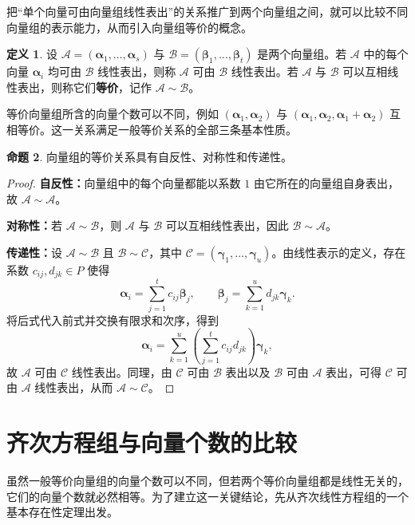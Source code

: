 \documentclass[UTF8, fontset=fandol, a4paper, 12pt]{ctexart}
\newcommand{\va}{\boldsymbol\alpha}
\newcommand{\vb}{\boldsymbol\beta}
\newcommand{\vg}{\boldsymbol\gamma}
\theoremstyle{definition}
\newtheorem{definition}{定义}[section]
\newtheorem{proposition}[definition]{命题}
\begin{document}
把“单个向量可由向量组线性表出”的关系推广到两个向量组之间，就可以比较不同向量组的表示能力，从而引入向量组等价的概念。

\begin{definition}
设 $\mathcal A=(\va_1,\ldots,\va_s)$ 与 $\mathcal B=(\vb_1,\ldots,\vb_t)$ 是两个向量组。若 $\mathcal A$ 中的每个向量 $\va_i$ 均可由 $\mathcal B$ 线性表出，则称 $\mathcal A$ 可由 $\mathcal B$ 线性表出。若 $\mathcal A$ 与 $\mathcal B$ 可以互相线性表出，则称它们\textbf{等价}，记作 $\mathcal A\sim\mathcal B$。
\end{definition}

等价向量组所含的向量个数可以不同，例如 $(\va_1,\va_2)$ 与 $(\va_1,\va_2,\va_1+\va_2)$ 互相等价。这一关系满足一般等价关系的全部三条基本性质。

\begin{proposition}
向量组的等价关系具有自反性、对称性和传递性。
\end{proposition}
\begin{proof}
\textbf{自反性：}向量组中的每个向量都能以系数 $1$ 由它所在的向量组自身表出，故 $\mathcal A\sim\mathcal A$。

\textbf{对称性：}若 $\mathcal A\sim\mathcal B$，则 $\mathcal A$ 与 $\mathcal B$ 可以互相线性表出，因此 $\mathcal B\sim\mathcal A$。

\textbf{传递性：}设 $\mathcal A\sim\mathcal B$ 且 $\mathcal B\sim\mathcal C$，其中 $\mathcal C=(\vg_1,\ldots,\vg_u)$。由线性表示的定义，存在系数 $c_{ij},d_{jk}\in P$ 使得
\[
 \va_i=\sum_{j=1}^{t}c_{ij}\vb_j,\qquad
 \vb_j=\sum_{k=1}^{u}d_{jk}\vg_k.
\]
将后式代入前式并交换有限求和次序，得到
\[
 \va_i=\sum_{k=1}^{u}\left(\sum_{j=1}^{t}c_{ij}d_{jk}\right)\vg_k,
\]
故 $\mathcal A$ 可由 $\mathcal C$ 线性表出。同理，由 $\mathcal C$ 可由 $\mathcal B$ 表出以及 $\mathcal B$ 可由 $\mathcal A$ 表出，可得 $\mathcal C$ 可由 $\mathcal A$ 线性表出，从而 $\mathcal A\sim\mathcal C$。
\end{proof}

\section{齐次方程组与向量个数的比较}

虽然一般等价向量组的向量个数可以不同，但若两个等价向量组都是线性无关的，它们的向量个数就必然相等。为了建立这一关键结论，先从齐次线性方程组的一个基本存在性定理出发。
\end{document}

